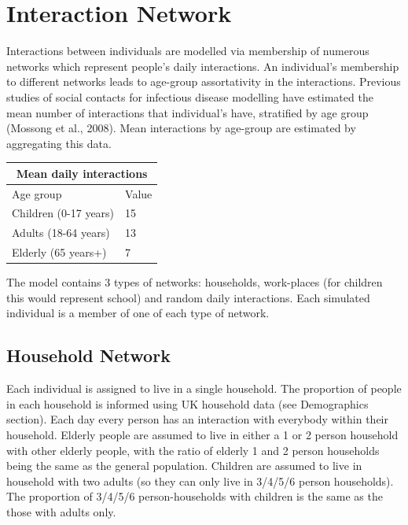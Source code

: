 \documentclass[11pt, oneside]{amsart}   	%
\begin{document}
\section{Interaction Network}

Interactions between individuals are modelled via membership of numerous networks which represent people's daily interactions.
An individual's membership to different networks leads to age-group assortativity in the interactions.
Previous studies of social contacts for infectious disease modelling have estimated the mean number of interactions that individual's have, stratified by age group (Mossong et al., 2008).
Mean interactions by age-group are estimated by aggregating this data.  

\medskip \medskip
\begin{table}[!htbp]
\centering
\begin{tabular}{ |p{5cm}|p{1.5cm}|  }
 \hline
 \multicolumn{2}{|c|}{Mean daily interactions} \\
 \hline
Age group  & Value \\
 \hline
 \hline 
Children (0-17 years) & 15 \\
Adults (18-64 years) & 13 \\
Elderly (65 years+) & 7 \\
 \hline
\end{tabular}
\end{table}
\medskip \medskip

The model contains 3 types of networks: households, work-places (for children this would represent school) and random daily interactions.  Each simulated individual is a member of one of each type of network.  

\subsection{Household Network}
Each individual is assigned to live in a single household.  The proportion of people in each household is informed using UK household data (see Demographics section).
Each day every person has an interaction with everybody within their household.
Elderly people are assumed to live in either a 1 or 2 person household with other elderly people, with the ratio of elderly 1 and 2 person households being the same as the general population.
Children are assumed to live in household with two adults (so they can only live in 3/4/5/6 person households). 
The proportion of 3/4/5/6 person-households with children is the same as the those with adults only.
\end{document}

